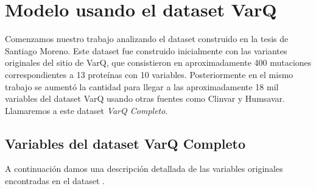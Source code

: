 \section{Modelo usando el dataset VarQ}

Comenzamos nuestro trabajo analizando el dataset construido en la tesis de Santiago Moreno. Este dataset fue construido inicialmente con las variantes originales del sitio de VarQ, que consistieron en aproximadamente 400 mutaciones correspondientes a 13 proteínas con 10 variables. Posteriormente en el mismo trabajo se aumentó la cantidad para llegar a las aproximadamente 18 mil variables del dataset VarQ usando otras fuentes como Clinvar y Humsavar. Llamaremos a este dataset \textit{VarQ Completo}. 

\subsection{Variables del dataset VarQ Completo}

A continuación damos una descripción detallada de las variables originales encontradas en el dataset . 

